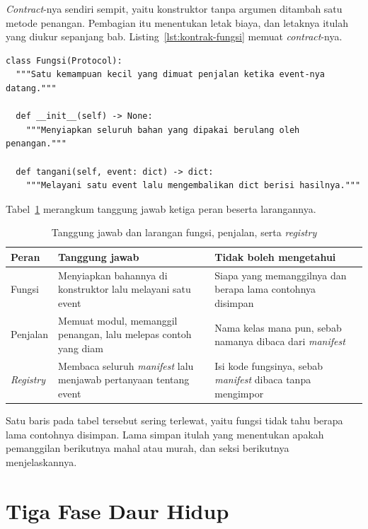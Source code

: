 \textit{Contract}-nya sendiri sempit, yaitu konstruktor tanpa argumen ditambah satu metode
penangan. Pembagian itu menentukan letak biaya, dan letaknya itulah yang diukur
sepanjang bab. Listing~\ref{lst:kontrak-fungsi} memuat \textit{contract}-nya.

\begin{lstlisting}[style=PythonStyle, caption={Kontrak yang wajib dipenuhi
  setiap fungsi, tersedia di \berkas{sources/chapter14/kontrak.py}},
  label=lst:kontrak-fungsi]
class Fungsi(Protocol):
  """Satu kemampuan kecil yang dimuat penjalan ketika event-nya datang."""

  def __init__(self) -> None:
    """Menyiapkan seluruh bahan yang dipakai berulang oleh penangan."""

  def tangani(self, event: dict) -> dict:
    """Melayani satu event lalu mengembalikan dict berisi hasilnya."""
\end{lstlisting}

Tabel~\ref{tab:peran-serverless} merangkum tanggung jawab ketiga peran beserta
larangannya.

\begin{table}[htbp]
  \centering
  \caption{Tanggung jawab dan larangan fungsi, penjalan, serta \textit{registry}}
  \label{tab:peran-serverless}
  \begin{tabularx}{\textwidth}{|l|X|X|}
    \hline
    \textbf{Peran} & \textbf{Tanggung jawab} & \textbf{Tidak boleh mengetahui} \\
    \hline
    Fungsi & Menyiapkan bahannya di konstruktor lalu melayani satu event & Siapa yang memanggilnya dan berapa lama contohnya disimpan \\
    \hline
    Penjalan & Memuat modul, memanggil penangan, lalu melepas contoh yang diam & Nama kelas mana pun, sebab namanya dibaca dari \textit{manifest} \\
    \hline
    \textit{Registry} & Membaca seluruh \textit{manifest} lalu menjawab pertanyaan tentang event & Isi kode fungsinya, sebab \textit{manifest} dibaca tanpa mengimpor \\
    \hline
  \end{tabularx}
\end{table}

Satu baris pada tabel tersebut sering terlewat, yaitu fungsi tidak tahu berapa
lama contohnya disimpan. Lama simpan itulah yang menentukan apakah pemanggilan
berikutnya mahal atau murah, dan seksi berikutnya menjelaskannya.

\section{Tiga Fase Daur Hidup}

